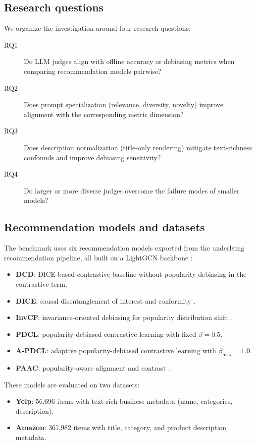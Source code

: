 \documentclass[pdflatex,sn-basic,referee,lineno]{sn-jnl}
\begin{document}
\subsection{Research questions}

We organize the investigation around four research questions:

\begin{description}
\item[RQ1] Do LLM judges align with offline accuracy or debiasing metrics when comparing recommendation models pairwise?
\item[RQ2] Does prompt specialization (relevance, diversity, novelty) improve alignment with the corresponding metric dimension?
\item[RQ3] Does description normalization (title-only rendering) mitigate text-richness confounds and improve debiasing sensitivity?
\item[RQ4] Do larger or more diverse judges overcome the failure modes of smaller models?
\end{description}

\subsection{Recommendation models and datasets}

The benchmark uses six recommendation models exported from the underlying recommendation pipeline, all built on a LightGCN backbone \citep{he2020lightgcn}:

\begin{itemize}
\item \textbf{DCD}: DICE-based contrastive baseline without popularity debiasing in the contrastive term.
\item \textbf{DICE}: causal disentanglement of interest and conformity \citep{zheng2021disentangling}.
\item \textbf{InvCF}: invariance-oriented debiasing for popularity distribution shift \citep{zhang2023invariant}.
\item \textbf{PDCL}: popularity-debiased contrastive learning with fixed $\beta = 0.5$.
\item \textbf{A-PDCL}: adaptive popularity-debiased contrastive learning with $\beta_{\max} = 1.0$.
\item \textbf{PAAC}: popularity-aware alignment and contrast \citep{cai2024paac}.
\end{itemize}

These models are evaluated on two datasets:
\begin{itemize}
\item \textbf{Yelp}: 56,696 items with text-rich business metadata (name, categories, description).
\item \textbf{Amazon}: 367,982 items with title, category, and product description metadata.
\end{itemize}
\end{document}
